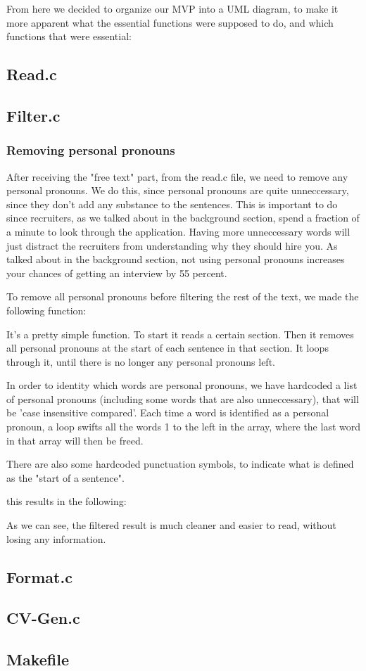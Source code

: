 From here we decided to organize our MVP into a UML diagram, to make it more apparent
what the essential functions were supposed to do, and which functions that were essential:

\subsection{Read.c}
\subsection{Filter.c}


\subsubsection{Removing personal pronouns}
After receiving the "free text" part, from the read.c file, we need to remove any personal pronouns.
We do this, since personal pronouns are quite unneccessary, since they don't add any substance to the sentences.
This is important to do since recruiters, as we talked about in the background section, spend a fraction of a minute
to look through the application. Having more unneccessary words will just distract the recruiters from understanding why they should hire you.
As talked about in the background section, not using personal pronouns increases your
chances of getting an interview by 55 percent.

To remove all personal pronouns before filtering the rest of the text, we made the following function:

It's a pretty simple function. To start it reads a certain section. Then it removes all personal pronouns at the start of each sentence in that section.
It loops through it, until there is no longer any personal pronouns left.

In order to identity which words are personal pronouns, we have hardcoded a list of personal pronouns (including some words that are also unneccessary), that will be 'case insensitive compared'.
Each time a word is identified as a personal pronoun, a loop swifts all the words 1 to the left in the array, where the last word in that array will then be freed.

There are also some hardcoded punctuation symbols, to indicate what is defined as the "start of a sentence". 

this results in the following:

As we can see, the filtered result is much cleaner and easier to read, without losing any information.


\subsection{Format.c}
\subsection{CV-Gen.c}
\subsection{Makefile}